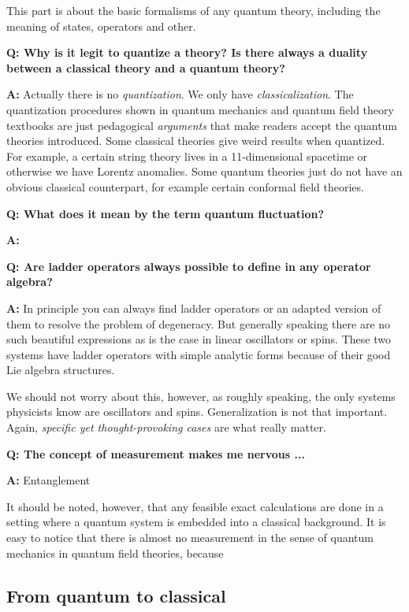 \documentclass[hyperref, a4paper]{article}
\newcommand*{\concept}[1]{{\textbf{#1}}}
\newenvironment{qanda}{\setlength{\parindent}{0pt}}{\bigskip}
\newcommand{\Q}{\bigskip\bfseries Q: }
\newcommand{\A}{\par\textbf{A:} \normalfont}
\begin{document}
This part is about the basic formalisms of any quantum theory, including the meaning of states, operators and other.

\begin{qanda}

\Q Why is it legit to quantize a theory? Is there always a duality between a classical theory and a quantum theory?
\A Actually there is no \emph{quantization}. We only have \emph{classicalization}. The quantization procedures shown in quantum mechanics and quantum field theory textbooks are just pedagogical \emph{arguments} that make readers accept the quantum theories introduced.
Some classical theories give weird results when quantized. For example, a certain string theory lives in a 11-dimensional spacetime or otherwise we have Lorentz anomalies.
Some quantum theories just do not have an obvious classical counterpart, for example certain conformal field theories.

\Q What does it mean by the term \concept{quantum fluctuation}?
\A 

\Q Are ladder operators always possible to define in any operator algebra?
\A In principle you can always find ladder operators or an adapted version of them to resolve the problem of degeneracy.
But generally speaking there are no such beautiful expressions as is the case in linear oscillators or spins.
These two systems have ladder operators with simple analytic forms because of their good Lie algebra structures.

We should not worry about this, however, as roughly speaking, the only systems physicists know are oscillators and spins.
Generalization is not that important. Again, \emph{specific yet thought-provoking cases} are what really matter.

\Q The concept of measurement makes me nervous ...
\A Entanglement

It should be noted, however, that any feasible exact calculations are done in a setting where a quantum system is embedded into a classical background.
It is easy to notice that there is almost no measurement in the sense of quantum mechanics in quantum field theories, because 

\end{qanda}

\subsection{From quantum to classical}
\end{document}
